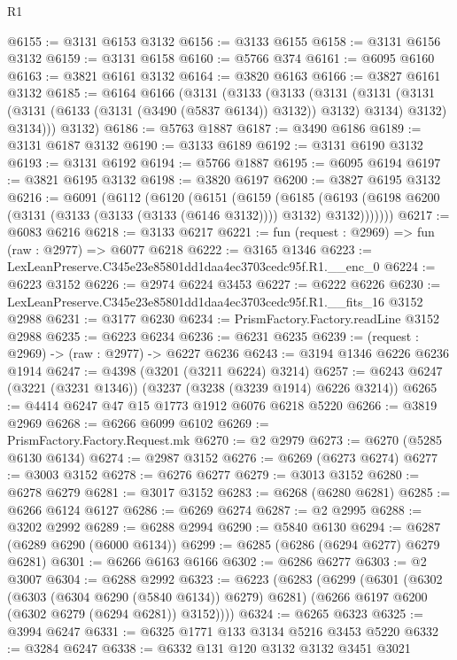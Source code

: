 \begin{lexlean}{R1}
\begin{coremodule}
@6155 := @3131 @6153 @3132
@6156 := @3133 @6155
@6158 := @3131 @6156 @3132
@6159 := @3131 @6158
@6160 := @5766 @374
@6161 := @6095 @6160
@6163 := @3821 @6161 @3132
@6164 := @3820 @6163
@6166 := @3827 @6161 @3132
@6185 := @6164
    @6166
    (@3131
      (@3133
        (@3133
          (@3131
            (@3131 (@3131 (@3131 (@6133 (@3131 (@3490 (@5837 @6134)) @3132)) @3132) @3134) @3132)
            @3134)))
      @3132)
@6186 := @5763 @1887
@6187 := @3490 @6186
@6189 := @3131 @6187 @3132
@6190 := @3133 @6189
@6192 := @3131 @6190 @3132
@6193 := @3131 @6192
@6194 := @5766 @1887
@6195 := @6095 @6194
@6197 := @3821 @6195 @3132
@6198 := @3820 @6197
@6200 := @3827 @6195 @3132
@6216 := @6091
    (@6112
      (@6120
        (@6151
          (@6159
            (@6185
              (@6193 (@6198 @6200 (@3131 (@3133 (@3133 (@3133 (@6146 @3132)))) @3132) @3132)))))))
@6217 := @6083 @6216
@6218 := @3133 @6217
@6221 := fun (request : @2969) => fun (raw : @2977) => @6077 @6218
@6222 := @3165 @1346
@6223 := LexLeanPreserve.C345e23e85801dd1daa4ec3703cedc95f.R1.__enc_0
@6224 := @6223 @3152
@6226 := @2974 @6224 @3453
@6227 := @6222 @6226
@6230 := LexLeanPreserve.C345e23e85801dd1daa4ec3703cedc95f.R1.__fits_16 @3152 @2988
@6231 := @3177 @6230
@6234 := PrismFactory.Factory.readLine @3152 @2988
@6235 := @6223 @6234
@6236 := @6231 @6235
@6239 := (request : @2969) -> (raw : @2977) -> @6227 @6236
@6243 := @3194 @1346 @6226 @6236 @1914
@6247 := @4398 (@3201 (@3211 @6224) @3214)
@6257 := @6243 @6247 (@3221 (@3231 @1346)) (@3237 (@3238 (@3239 @1914) @6226 @3214))
@6265 := @4414 @6247 @47 @15 @1773 @1912 @6076 @6218 @5220
@6266 := @3819 @2969
@6268 := @6266 @6099 @6102
@6269 := PrismFactory.Factory.Request.mk
@6270 := @2 @2979
@6273 := @6270 (@5285 @6130 @6134)
@6274 := @2987 @3152
@6276 := @6269 (@6273 @6274)
@6277 := @3003 @3152
@6278 := @6276 @6277
@6279 := @3013 @3152
@6280 := @6278 @6279
@6281 := @3017 @3152
@6283 := @6268 (@6280 @6281)
@6285 := @6266 @6124 @6127
@6286 := @6269 @6274
@6287 := @2 @2995
@6288 := @3202 @2992
@6289 := @6288 @2994
@6290 := @5840 @6130
@6294 := @6287 (@6289 @6290 (@6000 @6134))
@6299 := @6285 (@6286 (@6294 @6277) @6279 @6281)
@6301 := @6266 @6163 @6166
@6302 := @6286 @6277
@6303 := @2 @3007
@6304 := @6288 @2992
@6323 := @6223
    (@6283
      (@6299
        (@6301
          (@6302 (@6303 (@6304 @6290 (@5840 @6134)) @6279) @6281)
          (@6266 @6197 @6200 (@6302 @6279 (@6294 @6281)) @3152))))
@6324 := @6265 @6323
@6325 := @3994 @6247
@6331 := @6325 @1771 @133 @3134 @5216 @3453 @5220
@6332 := @3284 @6247
@6338 := @6332 @131 @120 @3132 @3132 @3451 @3021

\end{coremodule}
\end{lexlean}
